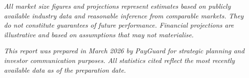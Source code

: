 \documentclass[12pt,a4paper]{article}
\begin{document}
\vspace{1cm}

\noindent\textit{All market size figures and projections represent estimates based on publicly
available industry data and reasonable inference from comparable markets. They do not constitute
guarantees of future performance. Financial projections are illustrative and based on assumptions
that may not materialise.}

\vspace{0.5cm}
\noindent\textit{This report was prepared in March 2026 by PayGuard for strategic planning
and investor communication purposes. All statistics cited reflect the most recently available
data as of the preparation date.}
\end{document}
